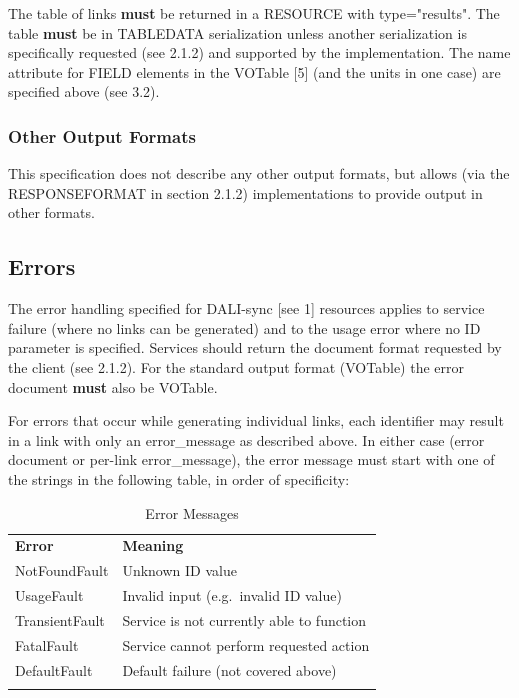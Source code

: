 \documentclass[11pt,a4paper]{ivoa}
\begin{document}
The table of links {\bf must} be returned in a RESOURCE with
type="results". The table {\bf must} be in TABLEDATA serialization
unless another serialization is specifically requested (see 2.1.2)
and supported by the implementation.
The name attribute for FIELD elements in the VOTable [5]
(and the units in one case) are specified above (see 3.2).


\subsubsection{Other Output Formats}

This specification does not describe any other output formats, but allows
(via the RESPONSEFORMAT in section 2.1.2) implementations to provide
output in other formats.


\subsection{Errors}

The error handling specified for DALI-sync [see 1] resources applies
to service failure (where no links can be generated) and to the usage
error where no ID parameter is specified. Services should return the
document format requested by the client (see 2.1.2). For the standard
output format (VOTable) the error document {\bf must} also be VOTable.

For errors that occur while generating individual links, each
identifier may result in a link with only an error\_message
as described above.
In either case (error document or per-link error\_message),
the error message must start with one of the strings in the
following table, in order of specificity:
\begin{table}[h]
\begin{center}
\begin{tabular}{|l|l|}
\sptablerule
{\bf Error} & {\bf Meaning} \\
\sptablerule
NotFoundFault  & Unknown ID value    \\
UsageFault     & Invalid input (e.g.\ invalid ID value) \\
TransientFault & Service is not currently able to function \\
FatalFault     & Service cannot perform requested action \\
DefaultFault   & Default failure (not covered above) \\
\sptablerule
\end{tabular}
\end{center}
\caption{Error Messages}
\end{table}
\end{document}
